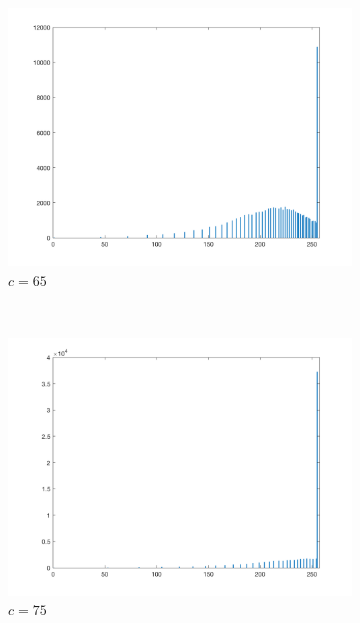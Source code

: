 \documentclass{article}
\begin{document}
\begin{enumerate}[label=(\alph*)]
\begin{figure}[!htb]
        \begin{subfigure}[b]{0.3\textwidth}
            \includegraphics[width=\textwidth]{img/hist_LT65.png}
            \caption{$c = 65$}
        \end{subfigure}
        ~
        \begin{subfigure}[b]{0.3\textwidth}
            \includegraphics[width=\textwidth]{img/hist_LT75.png}
            \caption{$c = 75$}
        \end{subfigure}
        ~
        \begin{subfigure}[b]{0.3\textwidth}

\end{subfigure}
\end{figure}
\end{enumerate}
\end{document}
